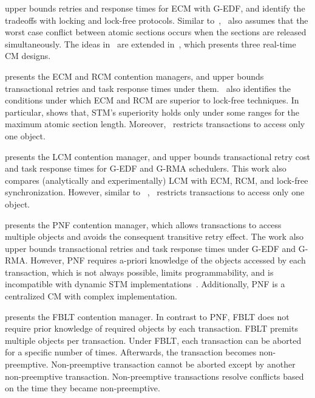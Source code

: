 \documentclass[conference]{IEEEtran}
\begin{document}
\cite{key-1} upper bounds retries and response times for ECM with G-EDF, and identify the tradeoffs with locking and lock-free protocols. Similar to~\cite{schoeberl2010rttm},~\cite{key-1} also assumes that the worst case conflict between atomic sections occurs when the sections are released simultaneously. The ideas in~\cite{key-1} are extended in~\cite{barrosmanaging}, which presents three real-time CM designs.
 
\cite{stmconcurrencycontrol:emsoft11} presents the ECM and RCM contention managers, and upper bounds transactional retries and task response times under them.~\cite{stmconcurrencycontrol:emsoft11} also identifies the conditions under which ECM and RCM are superior to lock-free techniques. In particular, \cite{stmconcurrencycontrol:emsoft11} shows that, STM's superiority holds only under some ranges for the maximum atomic section length.  Moreover,~\cite{stmconcurrencycontrol:emsoft11} restricts transactions to access only one object.

\cite{lcmdac2012} presents the LCM contention manager, and upper bounds transactional retry cost and task response times for G-EDF and G-RMA schedulers. This work also compares (analytically and experimentally) LCM with ECM, RCM, and lock-free synchronization. However, similar to~
\cite{lcmdac2012},~\cite{stmconcurrencycontrol:emsoft11} restricts transactions to access only one object. 

\cite{pnf_dac_asp} presents the PNF contention manager, which allows transactions to access  multiple objects and avoids the consequent transitive retry effect. The work also upper bounds transactional retries and task response times under G-EDF and G-RMA. However, PNF requires a-priori knowledge of the objects accessed by each transaction, which is not always possible, limits programmability, and is incompatible with dynamic STM implementations~\cite{Herlihy:2003:STM:872035.872048}. Additionally, PNF is a centralized CM with complex implementation.

\cite{fblt} presents the FBLT contention manager. In contrast to PNF, FBLT does not require prior knowledge of required objects by each transaction. FBLT premits multiple objects per transaction.
Under FBLT, each transaction can be aborted for a specific number of times. Afterwards, the transaction becomes non-preemptive. Non-preemptive transaction cannot be aborted except by another non-preemptive transaction. Non-preemptive transactions resolve conflicts based on the time they became non-preemptive. 
\end{document}
